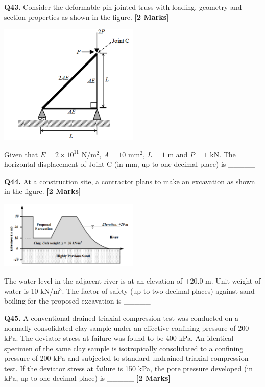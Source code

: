 \documentclass[11pt]{article}
\newcommand{\questionb}[2]{
    \noindent\textbf{Q#2.} #1 \hfill \textbf{[2 Marks]}
}
\begin{document}
\questionb{Consider the deformable pin-jointed truss with loading, geometry and section properties as shown in the figure.}{43}
\begin{center}
\includegraphics[width=0.5\textwidth]{figures/q43}
\end{center}
Given that \( E = 2 \times 10^{11} \) N/m\(^2\), \( A = 10 \) mm\(^2\), \( L = 1 \) m and \( P = 1 \) kN. The horizontal displacement of Joint C (in mm, up to one decimal place) is \_\_\_\_\_
\vspace{0.5cm}

\questionb{At a construction site, a contractor plans to make an excavation as shown in the figure.}{44}
\begin{center}
\includegraphics[width=0.5\textwidth]{figures/q44}
\end{center}
The water level in the adjacent river is at an elevation of +20.0 m. Unit weight of water is 10 kN/m\(^3\). The factor of safety (up to two decimal places) against sand boiling for the proposed excavation is \_\_\_\_\_
\vspace{0.5cm}

\questionb{A conventional drained triaxial compression test was conducted on a normally consolidated clay sample under an effective confining pressure of 200 kPa. The deviator stress at failure was found to be 400 kPa. An identical specimen of the same clay sample is isotropically consolidated to a confining pressure of 200 kPa and subjected to standard undrained triaxial compression test. If the deviator stress at failure is 150 kPa, the pore pressure developed (in kPa, up to one decimal place) is \_\_\_\_\_}{45}
\vspace{0.5cm}
\end{document}
